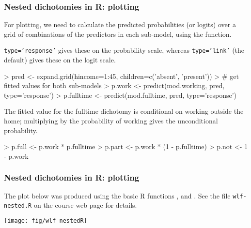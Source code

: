 \begin{frame}[fragile]
  \frametitle{Nested dichotomies in R: plotting}
  For plotting, we need to calculate the predicted probabilities (or logits) over
  a grid of combinations of the predictors in each sub-model, using the  function.
  
  \texttt{type='response'} gives these on the probability scale, whereas \texttt{type='link'}
  (the default) gives these on the logit scale.
\begin{Rin}
> pred <- expand.grid(hincome=1:45, children=c('absent', 'present'))
> # get fitted values for both sub-models
> p.work <- predict(mod.working, pred, type='response')
> p.fulltime <- predict(mod.fulltime, pred, type='response')
\end{Rin}
The fitted value for the fulltime dichotomy is \alert{conditional} on working outside the home;
multiplying by the probability of working gives the \alert{unconditional} probability.
\begin{Rin}
> p.full <- p.work * p.fulltime
> p.part <- p.work * (1 - p.fulltime)
> p.not <- 1 - p.work
\end{Rin}
\end{frame}

\begin{frame}
  \frametitle{Nested dichotomies in R: plotting}
  The plot below was produced using the basic R functions ,  and
  .  See the file \texttt{wlf-nested.R} on the course web page for details.
  \begin{center}
  \texttt{[image: fig/wlf-nestedR]}
  \end{center}
\end{frame}
